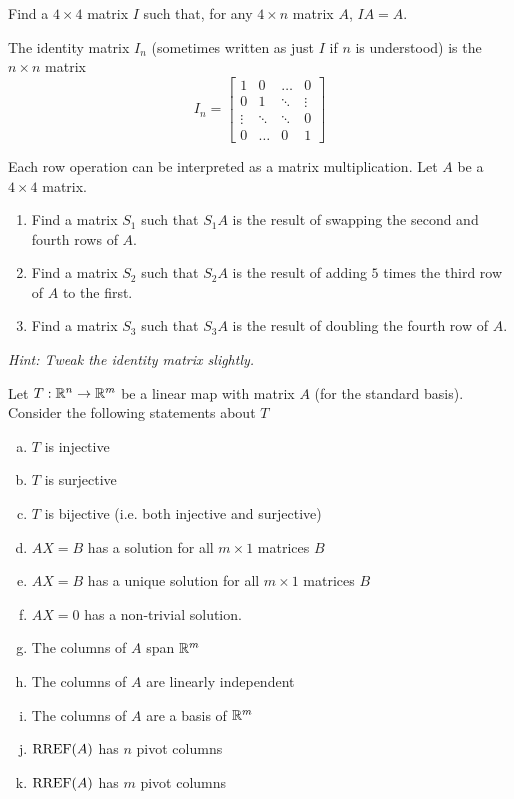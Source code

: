 
\begin{applicationActivities}{2}{22}

\begin{activity}{5}
Find a $4 \times 4$ matrix $I$ such that, for any $4 \times n$ matrix $A$, $IA=A$.
\end{activity}

\begin{definition}
The identity matrix $I_n$ (sometimes written as just $I$ if $n$ is understood) is  the $n \times n$ matrix $$I_n = \begin{bmatrix} 1 & 0  & \hdots & 0 \\ 0 & 1 & \ddots & \vdots  \\ \vdots & \ddots & \ddots & 0 \\ 0 & \hdots & 0 & 1 \end{bmatrix}$$
\end{definition}

\begin{activity}{15}
Each row operation can be interpreted as a matrix multiplication.  Let $A$ be a $4 \times 4$ matrix.
\begin{enumerate}[1)]
\item Find a matrix $S_1$ such that $S_1A$ is the result of swapping the second and fourth rows of $A$.
\item Find a matrix $S_2$ such that $S_2A$ is the result of adding $5$ times the third row of $A$ to the first.
\item Find a matrix $S_3$ such that $S_3A$ is the result of doubling the fourth row of $A$.
\end{enumerate}

{\em Hint:  Tweak the identity matrix slightly.}
\end{activity}


\begin{activity}{15}
Let $T: \mathbb{R}^n \rightarrow \mathbb{R}^m$ be a linear map with matrix $A$ (for the standard basis).  Consider the following statements about $T$
\begin{enumerate}[(a)]
\item $T$ is injective
\item $T$ is surjective
\item $T$ is bijective (i.e. both injective and surjective)
\item $AX=B$ has a solution for all $m \times 1$ matrices $B$
\item $AX=B$ has a unique solution for all $m \times 1$ matrices $B$
\item $AX=0$ has a non-trivial solution.
\item The columns of $A$ span $\mathbb{R}^m$
\item The columns of $A$ are linearly independent
\item The columns of $A$ are a basis of $\mathbb{R}^m$
\item $\operatorname{RREF}(A)$ has $n$ pivot columns
\item $\operatorname{RREF}(A)$ has $m$ pivot columns
\end{enumerate}


\end{activity}
\end{applicationActivities}
